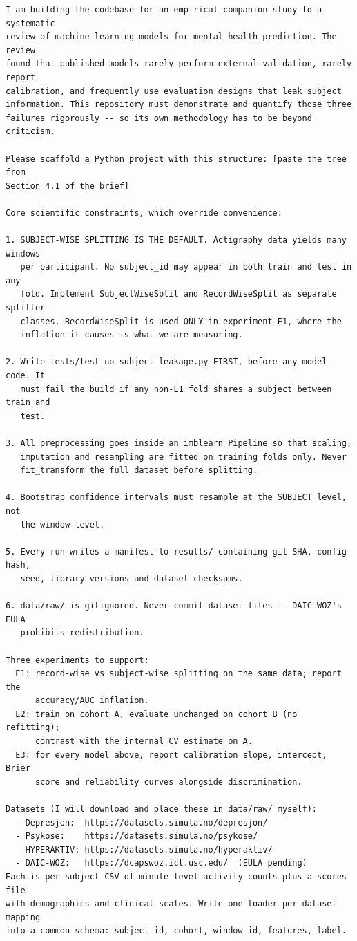 \documentclass[11pt,a4paper]{article}
\begin{document}
\begin{lstlisting}
I am building the codebase for an empirical companion study to a systematic
review of machine learning models for mental health prediction. The review
found that published models rarely perform external validation, rarely report
calibration, and frequently use evaluation designs that leak subject
information. This repository must demonstrate and quantify those three
failures rigorously -- so its own methodology has to be beyond criticism.

Please scaffold a Python project with this structure: [paste the tree from
Section 4.1 of the brief]

Core scientific constraints, which override convenience:

1. SUBJECT-WISE SPLITTING IS THE DEFAULT. Actigraphy data yields many windows
   per participant. No subject_id may appear in both train and test in any
   fold. Implement SubjectWiseSplit and RecordWiseSplit as separate splitter
   classes. RecordWiseSplit is used ONLY in experiment E1, where the
   inflation it causes is what we are measuring.

2. Write tests/test_no_subject_leakage.py FIRST, before any model code. It
   must fail the build if any non-E1 fold shares a subject between train and
   test.

3. All preprocessing goes inside an imblearn Pipeline so that scaling,
   imputation and resampling are fitted on training folds only. Never
   fit_transform the full dataset before splitting.

4. Bootstrap confidence intervals must resample at the SUBJECT level, not
   the window level.

5. Every run writes a manifest to results/ containing git SHA, config hash,
   seed, library versions and dataset checksums.

6. data/raw/ is gitignored. Never commit dataset files -- DAIC-WOZ's EULA
   prohibits redistribution.

Three experiments to support:
  E1: record-wise vs subject-wise splitting on the same data; report the
      accuracy/AUC inflation.
  E2: train on cohort A, evaluate unchanged on cohort B (no refitting);
      contrast with the internal CV estimate on A.
  E3: for every model above, report calibration slope, intercept, Brier
      score and reliability curves alongside discrimination.

Datasets (I will download and place these in data/raw/ myself):
  - Depresjon:  https://datasets.simula.no/depresjon/
  - Psykose:    https://datasets.simula.no/psykose/
  - HYPERAKTIV: https://datasets.simula.no/hyperaktiv/
  - DAIC-WOZ:   https://dcapswoz.ict.usc.edu/  (EULA pending)
Each is per-subject CSV of minute-level activity counts plus a scores file
with demographics and clinical scales. Write one loader per dataset mapping
into a common schema: subject_id, cohort, window_id, features, label.


\end{lstlisting}
\end{document}
